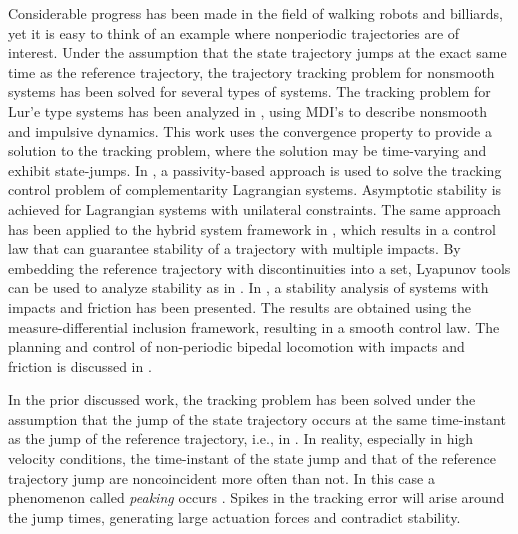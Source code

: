\documentclass[../DC2017114Bouma.tex]{subfiles}
\begin{document}
Considerable progress has been made in the field of walking robots and billiards, yet it is easy to think of an example where nonperiodic trajectories are of interest. Under the assumption that the state trajectory jumps at the exact same time as the reference trajectory, the trajectory tracking problem for nonsmooth systems has been solved for several types of systems. The tracking problem for Lur'e type systems has been analyzed in \cite{VanDeWouw2008,Wouw2010}, using MDI's to describe nonsmooth and impulsive dynamics. This work uses the convergence property to provide a solution to the tracking problem, where the solution may be time-varying and exhibit state-jumps. In \cite{Bourgeot2005}, a passivity-based approach is used to solve the tracking control problem of complementarity Lagrangian systems. Asymptotic stability is achieved for Lagrangian systems with unilateral constraints. The same approach has been applied to the hybrid system framework in \cite{Naldi2013}, which results in a control law that can guarantee stability of a trajectory with multiple impacts. By embedding the reference trajectory with discontinuities into a set, Lyapunov tools can be used to analyze stability as in \cite{Sanfelice2011,Sanfelice2014}. In \cite{Posa2016}, a stability analysis of systems with impacts and friction has been presented. The results are obtained using the measure-differential inclusion framework, resulting in a smooth control law. The planning and control of non-periodic bipedal locomotion with impacts and friction is discussed in \cite{Zhao2015a}.

In the prior discussed work, the tracking problem has been solved under the assumption that the jump of the state trajectory occurs at the same time-instant as the jump of the reference trajectory, i.e., in \cite{Naldi2013,Sanfelice2014,Posa2016}. In reality, especially in high velocity conditions, the time-instant of the state jump and that of the reference trajectory jump are noncoincident more often than not. In this case a phenomenon called \textit{peaking} occurs \cite{Biemond2013}. Spikes in the tracking error will arise around the jump times, generating large actuation forces and contradict stability.
\end{document}
